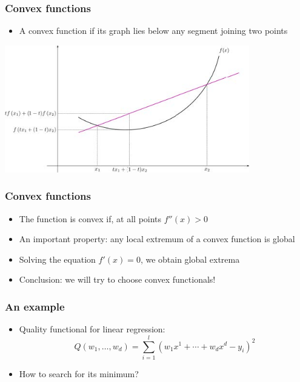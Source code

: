\documentclass[default]{beamer}
\begin{document}
	\begin{frame}
		\frametitle{Convex functions}
		
		\begin{itemize}
			\item A convex function if its graph lies below any segment joining two points
		\end{itemize}
		
		\centering
		\includegraphics[width=0.8\textwidth]{linear_13.jpg}
	\end{frame}

	\begin{frame}
		\frametitle{Convex functions}
		
		\Large
		\begin{itemize}
			\item The function is convex if, at all points $f''(x)>0$
			\item An important property: any local extremum of a convex function is global
			\item Solving the equation $f'(x)=0$, we obtain global extrema
			\item Conclusion: we will try to choose convex functionals!
		\end{itemize}

	\end{frame}


	\begin{frame}
		\frametitle{An example}
		
		\Large
		\begin{itemize}
			\item Quality functional for linear regression:
			\[
				Q(w_1,\dots,w_d)=\sum_{i=1}^l(w_1x^1+\cdots+w_dx^d-y_i)^2
			\]
			\item How to search for its minimum?
		\end{itemize}
		
	\end{frame}
\end{document}
